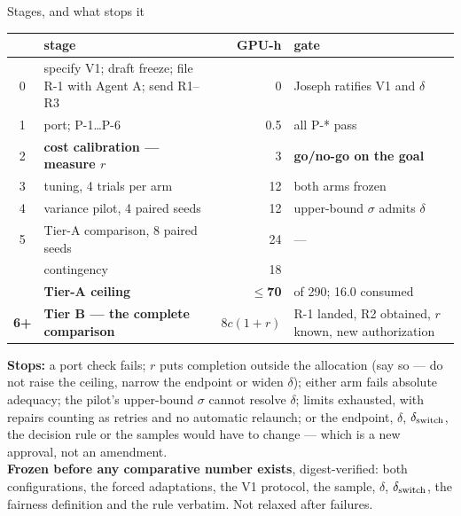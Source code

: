 \documentclass[aspectratio=169,10pt]{beamer}
\newcommand{\warn}[1]{\textcolor{warn}{#1}}
\renewcommand{\arraystretch}{1.12}
\begin{document}
\begin{frame}[t]{Stages, and what stops it}
  \vspace{0.4em}
  \begin{center}\footnotesize\renewcommand{\arraystretch}{1.05}
  \begin{tabular}{@{}cR{0.40\textwidth}rR{0.34\textwidth}@{}}
    \toprule
    & \textbf{stage} & \textbf{GPU-h} & \textbf{gate} \\
     & specify V1; draft freeze; file R-1 with Agent A; send R1--R3 & 0 &
      \warn{Joseph ratifies V1 and $\delta$} \\
    1 & port; P-1\ldots P-6 & 0.5 & all P-* pass \\
    2 & \textbf{cost calibration --- measure $r$} & 3 &
      \warn{\textbf{go/no-go on the goal}} \\
    3 & tuning, 4 trials per arm & 12 & both arms frozen \\
    4 & variance pilot, 4 paired seeds & 12 & upper-bound $\sigma$ admits $\delta$ \\
    5 & Tier-A comparison, 8 paired seeds & 24 & --- \\
    & contingency & 18 & \\
    \midrule
    & \textbf{Tier-A ceiling} & \textbf{$\le$70} & of 290; 16.0 consumed \\
    \textbf{6+} & \textbf{Tier B --- the complete comparison} &
      \warn{$8c(1{+}r)$} & R-1 landed, R2 obtained, $r$ known, new authorization \\
    \bottomrule
  \end{tabular}
  \end{center}
  \vspace{0.4em}
  {\footnotesize \textbf{Stops:} a port check fails; $r$ puts completion outside the
  allocation (\warn{say so --- do not raise the ceiling, narrow the endpoint or widen
  $\delta$}); either arm fails absolute adequacy; the pilot's upper-bound $\sigma$ cannot
  resolve $\delta$; limits exhausted, with repairs counting as retries and no automatic
  relaunch; or the endpoint, $\delta$, $\delta_{\rm switch}$, the decision rule or the
  samples would have to change --- which is a new approval, not an amendment.
  \\[0.4em]
  \textbf{Frozen before any comparative number exists}, digest-verified: both
  configurations, the forced adaptations, the V1 protocol, the sample, $\delta$,
  $\delta_{\rm switch}$, the fairness definition and the rule verbatim.
  \warn{Not relaxed after failures.}}
\end{frame}
\end{document}
